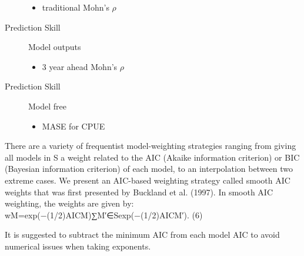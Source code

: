 \begin{description}
\begin{itemize}
    \item traditional Mohn's $\rho$
\end{itemize}
\item[Prediction Skill] Model outputs
 \begin{itemize}
    \item 3 year ahead Mohn's $\rho$ 
\end{itemize}
\item[Prediction Skill] Model free
\begin{itemize}
    \item MASE for CPUE
\end{itemize}
\end{description}






There are a variety of frequentist model-weighting strategies ranging from giving all models in S a weight related to the AIC (Akaike information criterion) or BIC (Bayesian information criterion) of each model, to an interpolation between two extreme cases. We present an AIC-based weighting strategy called smooth AIC weights that was first presented by Buckland et al. (1997). In smooth AIC weighting, the weights are given by:  
wM=exp(−(1/2)AICM)∑M′∈Sexp(−(1/2)AICM′).
(6)

It is suggested to subtract the minimum AIC from each model AIC to avoid numerical issues when taking exponents.

%